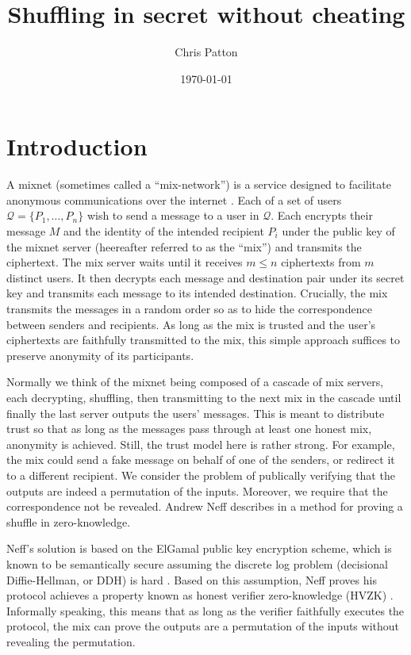 \documentclass[letter]{article}
\date{\today}
\title{Shuffling in secret without cheating}
\author{Chris Patton}
\renewcommand{\cal}[1]{\mathcal{#1}}
\begin{document}
  \maketitle

\section{Introduction}

A mixnet (sometimes called a ``mix-network'') is a service designed to
facilitate anonymous communications over the internet \cite{chaum81}. Each of a
set of users $\cal{Q} = \{P_1, \dots, P_n\}$ wish to send a message to a user in
$\cal{Q}$. Each encrypts their message $M$ and the identity of the intended
recipient $P_i$ under the public key of the mixnet server (heereafter referred
to as the ``mix'') and transmits the ciphertext.  The mix server waits until it
receives $m \le n$ ciphertexts from $m$ distinct users.  It then decrypts each
message and destination pair under its secret key and transmits each message to
its intended destination. Crucially, the mix transmits the messages in a random
order so as to hide the correspondence between senders and recipients.  As long
as the mix is trusted and the user's ciphertexts are faithfully transmitted to
the mix, this simple approach suffices to preserve anonymity of its
participants.

Normally we think of the mixnet being composed of a cascade of mix servers, each
decrypting, shuffling, then transmitting to the next mix in the cascade until
finally the last server outputs the users' messages. This is meant to distribute
trust so that as long as the messages pass through at least one honest mix,
anonymity is achieved. Still, the trust model here is rather strong. For
example, the mix could send a fake message on behalf of one of the senders, or
redirect it to a different recipient.  We consider the problem of publically
verifying that the outputs are indeed a permutation of the inputs. Moreover, we
require that the correspondence not be revealed. Andrew Neff describes in
\cite{neff01} a method for proving a shuffle in zero-knowledge.

Neff's solution is based on the ElGamal public key encryption scheme, which is
known to be semantically secure assuming the discrete log problem (decisional
Diffie-Hellman, or DDH) is hard \cite{elgamal84}. Based on this assumption, Neff
proves his protocol achieves a property known as honest verifier zero-knowledge
(HVZK) \cite{goldreich}. Informally speaking, this means that as long as the verifier
faithfully executes the protocol, the mix can prove the outputs are a
permutation of the inputs without revealing the permutation.
\end{document}
